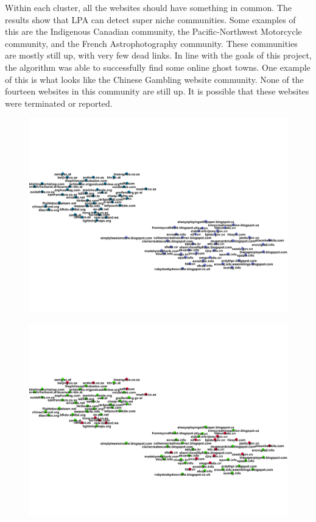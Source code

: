 \documentclass[conference]{IEEEtran}
\begin{document}
Within each cluster, all the websites should have something in common. The results show that LPA can detect super niche communities. Some examples of this are the Indigenous Canadian community, the Pacific-Northwest Motorcycle community, and the French Astrophotography community. These communities are mostly still up, with very few dead links. In line with the goals of this project, the algorithm was able to successfully find some online ghost towns. One example of this is what looks like the Chinese Gambling website community. None of the fourteen websites in this community are still up. It is possible that these websites were terminated or reported.

\begin{figure}[htbp]
 \centerline{\includegraphics[width=\columnwidth]{figs/01before.png}}
 \caption{}
\end{figure}

\begin{figure}[htbp]
 \centerline{\includegraphics[width=\columnwidth]{figs/01after.png}}
 \caption{}
\end{figure}
\end{document}

